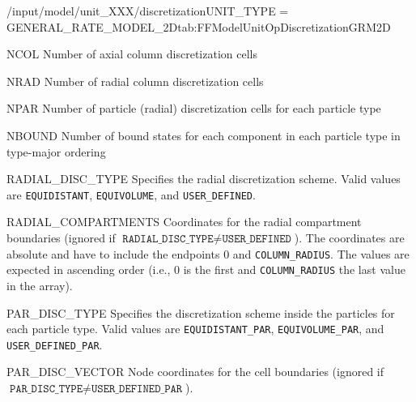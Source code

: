 \begin{condsubgroup}{/input/model/unit\_XXX/discretization}{UNIT\_TYPE = GENERAL\_RATE\_MODEL\_2D}{tab:FFModelUnitOpDiscretizationGRM2D}
  \begin{dataset}[type=int,range={$\geq 1$},length=1]{NCOL}
    Number of axial column discretization cells
  \end{dataset}
  \begin{dataset}[type=int,range={$\geq 1$},length=1]{NRAD}
    Number of radial column discretization cells
  \end{dataset}
  \begin{dataset}[type=int,range={$\geq 1$},length={\texttt{NPARTYPE}}]{NPAR}
    Number of particle (radial) discretization cells for each particle type
  \end{dataset}
  \begin{dataset}[type=int,range={$\geq 0$},length={$\texttt{NPARTYPE} \cdot \texttt{NCOMP}$}]{NBOUND}
    Number of bound states for each component in each particle type in type-major ordering
  \end{dataset}
  \begin{dataset}[type=string,length=1]{RADIAL\_DISC\_TYPE}
    Specifies the radial discretization scheme.
    Valid values are \texttt{EQUIDISTANT}, \texttt{EQUIVOLUME}, and \texttt{USER\_DEFINED}.
  \end{dataset}
  \begin{dataset}[unit=\si{\metre},type=double,range={$[0,\texttt{COLUMN\_RADIUS}]$},length={$\texttt{NRAD} + 1$}]{RADIAL\_COMPARTMENTS}
    Coordinates for the radial compartment boundaries (ignored if $\texttt{RADIAL\_DISC\_TYPE} \neq \texttt{USER\_DEFINED}$).
    The coordinates are absolute and have to include the endpoints $0$ and \texttt{COLUMN\_RADIUS}.
    The values are expected in ascending order (i.e., $0$ is the first and \texttt{COLUMN\_RADIUS} the last value in the array).
  \end{dataset}
  \begin{dataset}[type=string,length={\texttt{NPARTYPE}}]{PAR\_DISC\_TYPE}
    Specifies the discretization scheme inside the particles for each particle type.
    Valid values are \texttt{EQUIDISTANT\_PAR}, \texttt{EQUIVOLUME\_PAR}, and \texttt{USER\_DEFINED\_PAR}.
  \end{dataset}
  \begin{dataset}[unit=--,type=double,range={$[0,1]$},length={$\sum_i (\texttt{NPAR}_i + 1)$}]{PAR\_DISC\_VECTOR}
    Node coordinates for the cell boundaries (ignored if $\texttt{PAR\_DISC\_TYPE} \neq \texttt{USER\_DEFINED\_PAR}$).

\end{dataset}
\end{condsubgroup}
